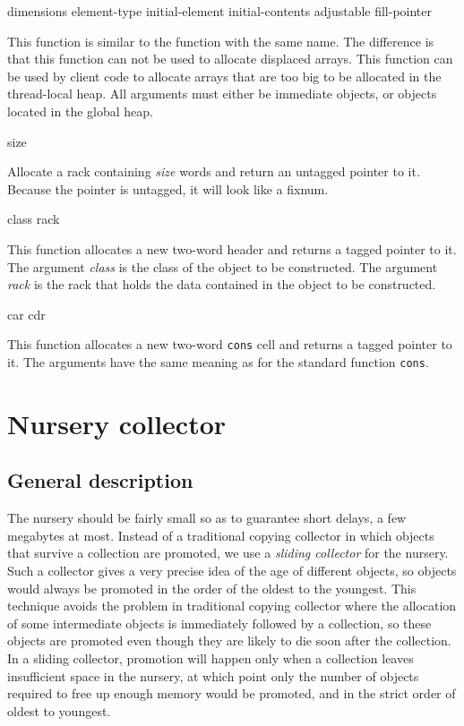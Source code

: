 {dimensions \key element-type initial-element
  initial-contents adjustable fill-pointer}

This function is similar to the \commonlisp{} function with the same
name.  The difference is that this function can not be used to
allocate displaced arrays.  This function can be used by client code
to allocate arrays that are too big to be allocated in the
thread-local heap.  All arguments must either be immediate objects, or
objects located in the global heap.

 {size}

Allocate a rack containing \textit{size} words and return an untagged
pointer to it.  Because the pointer is untagged, it will look like a
fixnum.

 {class rack}

This function allocates a new two-word header and returns a tagged
pointer to it.  The argument \textit{class} is the class of the object
to be constructed.  The argument \textit{rack} is the rack that holds
the data contained in the object to be constructed.

 {car cdr}

This function allocates a new two-word \texttt{cons} cell and returns
a tagged pointer to it.  The arguments have the same meaning as for
the standard \commonlisp{} function \texttt{cons}.

\section{Nursery collector}

\subsection{General description}

The nursery should be fairly small so as to guarantee short delays, a
few megabytes at most.  Instead of a traditional copying collector in
which objects that survive a collection are promoted, we use a
\emph{sliding collector} for the nursery.  Such a collector gives a
very precise idea of the age of different objects, so objects would
always be promoted in the order of the oldest to the youngest.  This
technique avoids the problem in traditional copying collector where
the allocation of some intermediate objects is immediately followed by
a collection, so these objects are promoted even though they are
likely to die soon after the collection.  In a sliding collector,
promotion will happen only when a collection leaves insufficient space
in the nursery, at which point only the number of objects required to
free up enough memory would be promoted, and in the strict order of
oldest to youngest.

